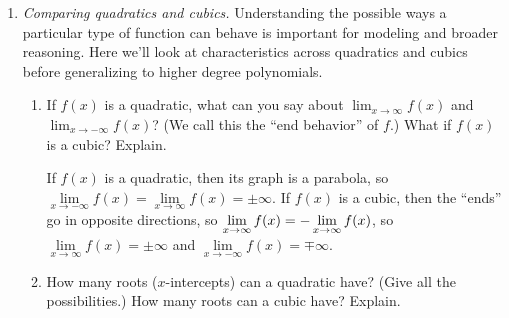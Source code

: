 \documentclass{article}
\begin{document}
\begin{enumerate}[resume, topsep=0pt]
\begin{solution}
  \end{solution}

\item \emph{Comparing quadratics and cubics.} Understanding the possible ways a particular type of function can behave is important for modeling and broader reasoning. Here we'll look at characteristics across quadratics and cubics before generalizing to higher degree polynomials.

  \begin{enumerate}
  \item


    \begin{problem}[\vfill]
      If $f(x)$ is a quadratic, what can you say about $\displaystyle \lim_{x \to \infty} f(x)$ and $\displaystyle \lim_{x \to -\infty} f(x)$? (We call this the ``end behavior'' of $f$.) What if $f(x)$ is a cubic? Explain.
    \end{problem}

    \begin{solution}
      If $f(x)$ is a quadratic, then its graph is a parabola, so
      $\lim\limits_{x\to-\infty} f(x) = \lim\limits_{x \to \infty} f(x)=
      \pm \infty$. If $f(x)$ is a cubic, then the ``ends'' go in
      opposite directions, so $\lim\limits_{x\to\-\infty} f(x)
      = -\lim\limits_{x\to\infty} f(x)$, so $\lim\limits_{x\to\infty} f(x)
      = \pm \infty$ and $\lim\limits_{x\to-\infty} f(x) = \mp \infty$.
    \end{solution}

  \item


    \begin{problem}[\vfill]
      How many roots ($x$-intercepts) can a quadratic have? (Give all the possibilities.) How many roots can a cubic have? Explain.
    \end{problem}


\end{enumerate}
\end{enumerate}
\end{document}
